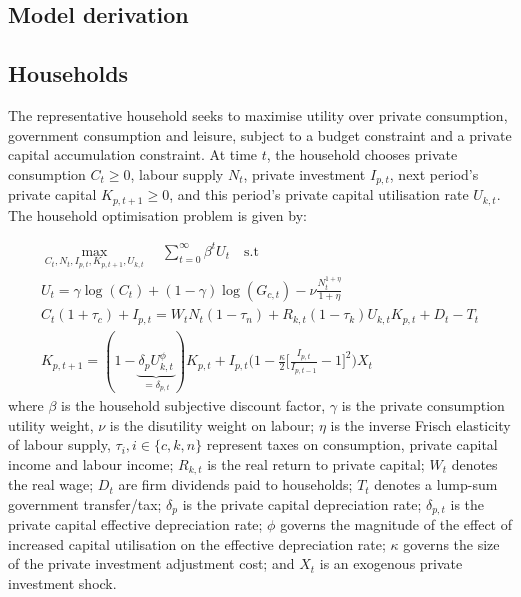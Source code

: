 \documentclass[titlepage, 11pt, a4paper]{article}
\renewcommand{\&}{and}
\begin{document}
\begin{appendices}
\section{Model derivation} \label{model_derivation_appendix}
\subsection{Households}
The representative household seeks to maximise utility over private consumption, government consumption and leisure, subject to a budget constraint and a private capital accumulation constraint.  At time $t$, the household chooses private consumption $C_t \geq0$, labour supply $N_t$, private investment $I_{p,t}$, next period's private capital $K_{p,t+1} \geq 0$, and this period's private capital utilisation rate $U_{k,t}$.  The household optimisation problem is given by: 

\begin{gather}
    \max\limits_{C_t, N_t, I_{p,t}, K_{p,t+1}, U_{k,t}} \quad \sum_{t=0}^\infty \beta^tU_t \quad \text{s.t} \\
    U_t = \gamma \log(C_t)+ (1-\gamma)\log(G_{c,t}) - \nu \frac{N_t^{1+\eta}}{1+\eta}
    \label{eq:utility_def} \\
    C_t(1+\tau_c) + I_{p,t} = W_tN_t(1-\tau_{n}) + R_{k,t}(1-\tau_k)U_{k,t}K_{p,t} + D_t - T_t \\
    K_{p,t+1} = (1-\underbrace{\delta_{p}U_{k,t}^\phi}_{=\delta_{p,t}})K_{p,t} + I_{p,t}\Big(1-\frac{\kappa}{2}\Big[ \frac{I_{p,t}}{I_{p,t-1}} -1 \Big]^2\Big)X_t
\end{gather}
where $\beta$ is the household subjective discount factor, $\gamma$ is the private consumption utility weight, $\nu$ is the disutility weight on labour; $\eta$ is the inverse Frisch elasticity of labour supply, $\tau_i,  i\in \{c,k,n\}$ represent taxes on consumption, private capital income and labour income; $R_{k,t}$ is the real return to private capital; $W_t$ denotes the real wage; $D_t$ are firm dividends paid to households; $T_t$ denotes a lump-sum government transfer/tax; $\delta_p$ is the private capital depreciation rate; $\delta_{p,t}$ is the private capital effective depreciation rate; $\phi$ governs the magnitude of the effect of increased capital utilisation on the effective depreciation rate; $\kappa$ governs the size of the private investment adjustment cost; and $X_t$ is an exogenous private investment shock. \par 


\end{appendices}
\end{document}

